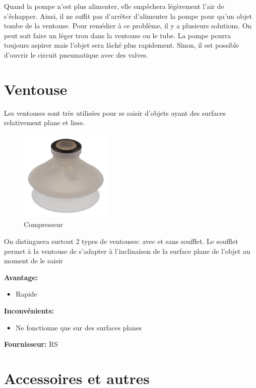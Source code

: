 \documentclass[a4paper, 11pt]{report}
\begin{document}
Quand la pompe n'est plus alimenter, elle empêchera légèrement l'air de s'échapper. Ainsi, il ne suffit pas d'arrêter d'alimenter la pompe pour qu'un objet tombe de la ventouse. Pour remédier à ce problème, il y a plusieurs solutions. On peut soit faire un léger trou dans la ventouse ou le tube. La pompe pourra toujours aspirer mais l'objet sera lâché plus rapidement. Sinon, il est possible d'ouvrir le circuit pneumatique avec des valves.

\section{Ventouse}
Les ventouses sont très utilisées pour se saisir d'objets ayant des surfaces relativement plane et lisse.

\begin{figure}
\begin{centering}
\includegraphics[width=0.4\textwidth]{images/ventouseSoufflet.jpg}
\caption{Compresseur}
\par\end{centering}
\end{figure}

On distinguera surtout 2 types de ventouses: avec et sans soufflet. Le soufflet permet à la ventouse de s'adapter à l'inclinaison de la surface plane de l'objet au moment de le saisir

\textbf{Avantage:}
\begin{itemize}
\item Rapide
\end{itemize}

\textbf{Inconvénients:}
\begin{itemize}
\item Ne fonctionne que sur des surfaces planes
\end{itemize}

\textbf{Fournisseur:} RS

\section{Accessoires et autres}
\end{document}
